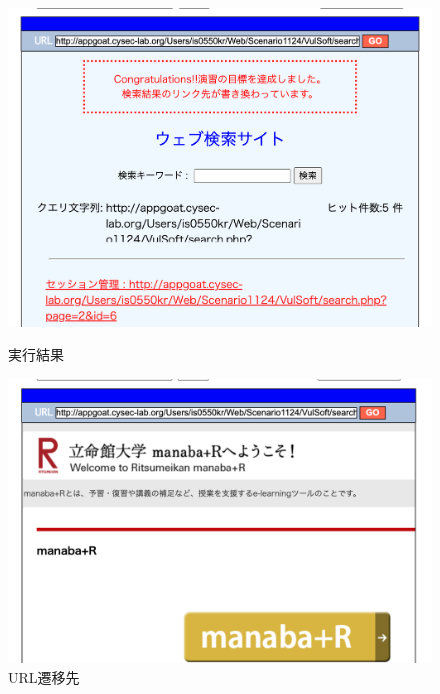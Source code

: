 \documentclass[dvipdfmx,autodetect-engine,titlepage]{jsarticle}
\begin{document}
\begin{figure}[H]
  \centering
  \begin{minipage}[b]{0.45\linewidth}
  \begin{center}
    \includegraphics[keepaspectratio,scale=0.32]{web11.png}
    \end{center}
    \caption{実行結果}
  \end{minipage}
  \begin{minipage}[b]{0.45\linewidth}
  \begin{center}
    \includegraphics[keepaspectratio,scale=0.32]{web12.png}
    \end{center}
    \caption{URL遷移先}
  \end{minipage}
\end{figure}
\end{document}
